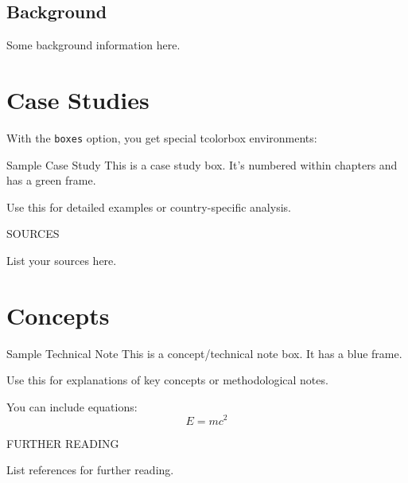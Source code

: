 \documentclass[12pt, colorlinks, glossary, boxes]{bp-book}
\begin{document}
\section{Background}

Some background information here.

% 


\chapter{Case Studies}
\label{chap:casestudies}

With the \texttt{boxes} option, you get special tcolorbox environments:

\begin{boxcasestudy}{Sample Case Study}
    This is a case study box. It's numbered within chapters and has a green frame.

    Use this for detailed examples or country-specific analysis.

    \tcblower
    SOURCES

    List your sources here.
\end{boxcasestudy}

% 


\chapter{Concepts}
\label{chap:concepts}

\begin{boxconcept}{Sample Technical Note}
    This is a concept/technical note box. It has a blue frame.

    Use this for explanations of key concepts or methodological notes.

    You can include equations:
    \[
        E = mc^2
    \]

    \tcblower
    FURTHER READING

    List references for further reading.
\end{boxconcept}
\end{document}
